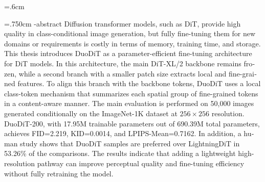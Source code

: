 \baselineskip=.6cm
\begin{latin}
\newpage
\thispagestyle{empty}
\baselineskip=.750cm
\en-abstract{%
Diffusion transformer models, such as DiT, provide high quality in class-conditional image generation, but fully fine-tuning them for new domains or requirements is costly in terms of memory, training time, and storage. This thesis introduces DuoDiT as a parameter-efficient fine-tuning architecture for DiT models. In this architecture, the main DiT-XL/2 backbone remains frozen, while a second branch with a smaller patch size extracts local and fine-grained features. To align this branch with the backbone tokens, DuoDiT uses a local class-token mechanism that summarizes each spatial group of fine-grained tokens in a content-aware manner. The main evaluation is performed on 50,000 images generated conditionally on the ImageNet-1K dataset at $256 \times 256$ resolution. DuoDiT-200, with 17.95M trainable parameters out of 690.39M total parameters, achieves FID=2.219, KID=0.0014, and LPIPS-Mean=0.7162. In addition, a human study shows that DuoDiT samples are preferred over LightningDiT in 53.26\% of the comparisons. The results indicate that adding a lightweight high-resolution pathway can improve perceptual quality and fine-tuning efficiency without fully retraining the model.
}


\end{latin}
